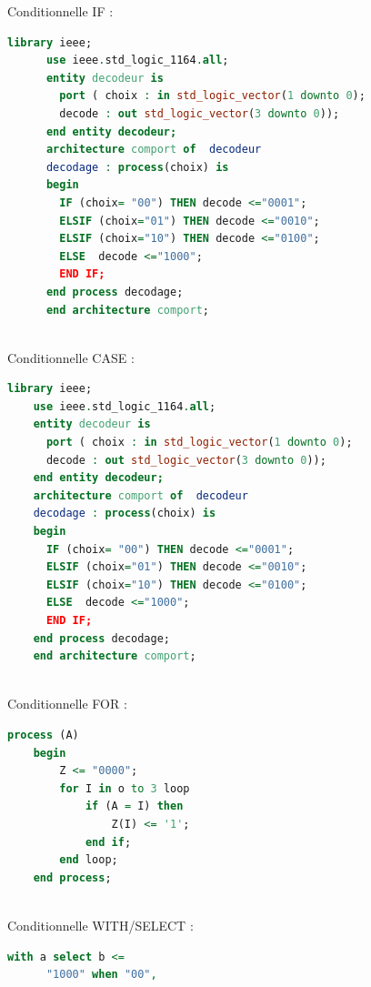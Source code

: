 \documentclass[10pt]{article}
\begin{document}
\begin{multicols}{2}
  Conditionnelle IF :\\
  \begin{minipage}[t]{8cm}
    \begin{lstlisting}[language=VHDL]
      library ieee;
      use ieee.std_logic_1164.all;
      entity decodeur is
        port ( choix : in std_logic_vector(1 downto 0);
        decode : out std_logic_vector(3 downto 0));
      end entity decodeur;
      architecture comport of  decodeur
      decodage : process(choix) is
      begin
        IF (choix= "00") THEN decode <="0001";
        ELSIF (choix="01") THEN decode <="0010";
        ELSIF (choix="10") THEN decode <="0100";
        ELSE  decode <="1000";
        END IF;
      end process decodage;
      end architecture comport;
    \end{lstlisting}
  \end{minipage}\\
  Conditionnelle CASE :\\
  \begin{minipage}[t]{8cm}
    \begin{lstlisting}[language=VHDL]
    library ieee;
    use ieee.std_logic_1164.all;
    entity decodeur is
      port ( choix : in std_logic_vector(1 downto 0);
      decode : out std_logic_vector(3 downto 0));
    end entity decodeur;
    architecture comport of  decodeur
    decodage : process(choix) is
    begin
      IF (choix= "00") THEN decode <="0001";
      ELSIF (choix="01") THEN decode <="0010";
      ELSIF (choix="10") THEN decode <="0100";
      ELSE  decode <="1000";
      END IF;
    end process decodage;
    end architecture comport;
    \end{lstlisting}
  \end{minipage}\\
  Conditionnelle FOR :\\
  \begin{minipage}[t]{8cm}
    \begin{lstlisting}[language=VHDL]
    process (A)
    begin
    	Z <= "0000";
    	for I in o to 3 loop
    		if (A = I) then
    			Z(I) <= '1';
    		end if;
    	end loop;
    end process;
    \end{lstlisting}
  \end{minipage}\\
  Conditionnelle WITH/SELECT :\\
  \begin{minipage}[t]{8cm}
    \begin{lstlisting}[language=VHDL]
    with a select b <=
      "1000" when "00",

\end{lstlisting}
\end{minipage}
\end{multicols}
\end{document}
